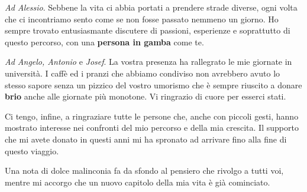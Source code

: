 \emph{Ad Alessio}. Sebbene la vita ci abbia portati a prendere strade diverse, ogni volta che ci incontriamo sento come se non fosse passato nemmeno un giorno. Ho sempre trovato entusiasmante discutere di passioni, esperienze e soprattutto di questo percorso, con una \textbf{persona in gamba} come te.  

\emph{Ad Angelo, Antonio} e \emph{Josef}. La vostra presenza ha rallegrato le mie giornate in università. I caffè ed i pranzi che abbiamo condiviso non avrebbero avuto lo stesso sapore senza un pizzico del vostro umorismo che è sempre riuscito a donare \textbf{brio} anche alle giornate più monotone. Vi ringrazio di cuore per esserci stati. 

Ci tengo, infine, a ringraziare tutte le persone che, anche con piccoli gesti, hanno mostrato interesse nei confronti del mio percorso e della mia crescita. Il supporto che mi avete donato in questi anni mi ha spronato ad arrivare fino alla fine di questo viaggio.

Una nota di dolce malinconia fa da sfondo al pensiero che rivolgo a tutti voi, mentre mi accorgo che un nuovo capitolo della mia vita è già cominciato. 